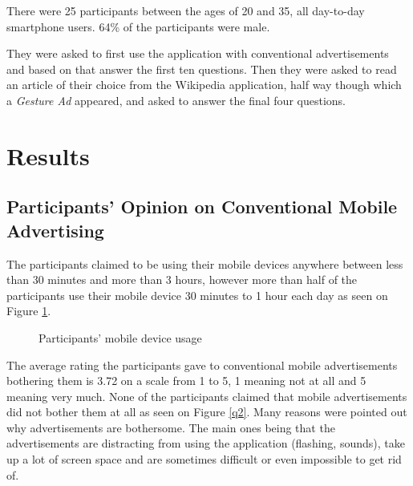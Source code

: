 There were 25 participants between the ages of 20 and 35, all day-to-day smartphone users. 64\% of the participants were male.

They were asked to first use the application with conventional advertisements and based on that answer the first ten questions. Then they were asked to read an article of their choice from the Wikipedia application, half way though which a \textit{Gesture Ad} appeared, and asked to answer the final four questions.

\section{Results}

\subsection{Participants' Opinion on Conventional Mobile Advertising}

The participants claimed to be using their mobile devices anywhere between less than 30 minutes and more than 3 hours, however more than half of the participants use their mobile device 30 minutes to 1 hour each day as seen on Figure \ref{q1}.

\begin{figure}
\begin{center}
\caption{Participants' mobile device usage}
\label{q1}
\end{center}
\end{figure}

The average rating the participants gave to conventional mobile advertisements bothering them is 3.72 on a scale from 1 to 5, 1 meaning not at all and 5 meaning very much. None of the participants claimed that mobile advertisements did not bother them at all as seen on Figure \ref{q2}. Many reasons were pointed out why advertisements are bothersome. The main ones being that the advertisements are distracting from using the application (flashing, sounds), take up a lot of screen space and are sometimes difficult or even impossible to get rid of.

